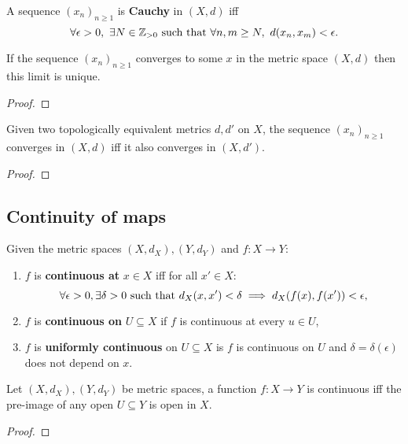 \documentclass[../Year2.tex]{subfiles}
\begin{document}
\begin{definition}
    A sequence ${(x_n)}_{n\geq 1}$ is \textbf{Cauchy} in $(X,d)$ iff \[
        \forall\epsilon>0, \ \exists N\in\mathbb{Z}_{>0} \ \text{\textcolor{black}{such that }} \forall n,m\geq N,\  d(x_n,x_m)<\epsilon\text{\textcolor{black}{.}}
    \]
    \vspace{-20pt}
\end{definition}

\begin{lemma}
    If the sequence ${(x_n)}_{n\geq 1}$ converges to some $x$ in the metric space $(X,d)$ then this limit is unique.
    \begin{proof}
        
    \end{proof}
\end{lemma}

\begin{theorem}
    Given two topologically equivalent metrics $d,d'$ on $X$, the sequence ${(x_n)}_{n\geq 1}$ converges in $(X,d)$ iff it also converges in $(X,d')$.
    \begin{proof}
        
    \end{proof}
\end{theorem}

\subsection{Continuity of maps}

\begin{definition}
    Given the metric spaces $(X,d_X), (Y,d_Y)$ and $f:X\rightarrow Y$: \begin{enumerate}
        \item $f$ is \textbf{continuous at} $x\in X$ iff for all $x'\in X$: \[
            \forall\epsilon>0, \exists\delta>0 \ \black{such that } d_X(x,x')<\delta \implies d_X(f(x),f(x'))<\epsilon \black{,}
        \] \vspace{-20pt}
        \item $f$ is \textbf{continuous on} $U\subseteq X$ if $f$ is continuous at every $u\in U$,
        \item $f$ is \textbf{uniformly continuous} on $U\subseteq X$ is $f$ is continuous on $U$ and $\delta=\delta(\epsilon)$ does not depend on $x$.
    \end{enumerate}
\end{definition}

\begin{theorem}
    Let $(X,d_X), (Y,d_Y)$ be metric spaces, a function $f:X\rightarrow Y$ is continuous iff the pre-image of any open $U\subseteq Y$ is open in $X$.
    \begin{proof}
        
    \end{proof}
\end{theorem}
\end{document}
